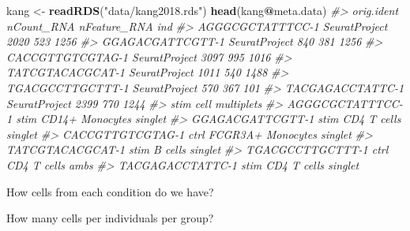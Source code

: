 \documentclass[
]{book}
\newenvironment{Shaded}{\begin{snugshade}}{\end{snugshade}}
\newcommand{\CommentTok}[1]{\textcolor[rgb]{0.56,0.35,0.01}{\textit{#1}}}
\newcommand{\FunctionTok}[1]{\textcolor[rgb]{0.13,0.29,0.53}{\textbf{#1}}}
\newcommand{\NormalTok}[1]{#1}
\newcommand{\OtherTok}[1]{\textcolor[rgb]{0.56,0.35,0.01}{#1}}
\newcommand{\SpecialCharTok}[1]{\textcolor[rgb]{0.81,0.36,0.00}{\textbf{#1}}}
\newcommand{\StringTok}[1]{\textcolor[rgb]{0.31,0.60,0.02}{#1}}
\begin{document}
\begin{Shaded}
\begin{Highlighting}[]
\NormalTok{kang }\OtherTok{\textless{}{-}} \FunctionTok{readRDS}\NormalTok{(}\StringTok{"data/kang2018.rds"}\NormalTok{)}
\FunctionTok{head}\NormalTok{(kang}\SpecialCharTok{@}\NormalTok{meta.data)}
\CommentTok{\#\textgreater{}                     orig.ident nCount\_RNA nFeature\_RNA  ind}
\CommentTok{\#\textgreater{} AGGGCGCTATTTCC{-}1 SeuratProject       2020          523 1256}
\CommentTok{\#\textgreater{} GGAGACGATTCGTT{-}1 SeuratProject        840          381 1256}
\CommentTok{\#\textgreater{} CACCGTTGTCGTAG{-}1 SeuratProject       3097          995 1016}
\CommentTok{\#\textgreater{} TATCGTACACGCAT{-}1 SeuratProject       1011          540 1488}
\CommentTok{\#\textgreater{} TGACGCCTTGCTTT{-}1 SeuratProject        570          367  101}
\CommentTok{\#\textgreater{} TACGAGACCTATTC{-}1 SeuratProject       2399          770 1244}
\CommentTok{\#\textgreater{}                  stim              cell multiplets}
\CommentTok{\#\textgreater{} AGGGCGCTATTTCC{-}1 stim   CD14+ Monocytes    singlet}
\CommentTok{\#\textgreater{} GGAGACGATTCGTT{-}1 stim       CD4 T cells    singlet}
\CommentTok{\#\textgreater{} CACCGTTGTCGTAG{-}1 ctrl FCGR3A+ Monocytes    singlet}
\CommentTok{\#\textgreater{} TATCGTACACGCAT{-}1 stim           B cells    singlet}
\CommentTok{\#\textgreater{} TGACGCCTTGCTTT{-}1 ctrl       CD4 T cells       ambs}
\CommentTok{\#\textgreater{} TACGAGACCTATTC{-}1 stim       CD4 T cells    singlet}
\end{Highlighting}
\end{Shaded}

How cells from each condition do we have?

\begin{Shaded}
\end{Shaded}

How many cells per individuals per group?

\begin{Shaded}
\end{Shaded}
\end{document}
